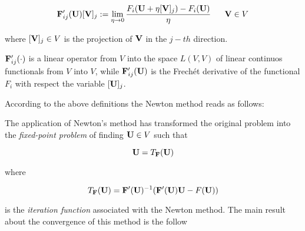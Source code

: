 \begin{equation}
\vect{F}'_{ij}(\vect{U})[\vect{V}]_j := \lim_{\eta \to 0}\dfrac{F_i(\vect{U}+\eta [\vect{V}]_j)-F_i(\vect{U})}{\eta}  \psp{10} \vect{V} \in V
\end{equation}

where $[\mathbf{V}]_j \in V$ is the projection  of  $\mathbf{V}$ in the $j-th$ direction. 

$\mathbf{F}'_{ij}(\cdot)$ is a linear operator from $V$ into the space $L(V,V)$ of linear continuos functionals from $V$ into $V$, while $\mathbf{F}'_{ij}(\mathbf{U})$ is the Frech\'et derivative of the functional $F_i$ with respect the variable $[\mathbf{U}]_j$.

According to the above definitions the Newton method reads as follows:


\vspace{0.3cm}
The application of Newton's method has transformed the original problem  into the \textit{fixed-point problem} of finding $\mathbf{U} \in V$ such that

\begin{equation}
\label{eq: fixed point U}
\mathbf{U} = T_{\mathbf{F}}(\mathbf{U})
\end{equation}

where 

\begin{equation}
\label{eq: iteration function}
T_{\mathbf{F}}(\mathbf{U}) = \mathbf{F}'(\mathbf{U})^{-1}(\mathbf{F}'(\mathbf{U})\mathbf{U}-F(\mathbf{U}))
\end{equation}

is the \textit{iteration function} associated with the Newton method.
The main result about the convergence of this method is the follow \cite{Ortega:IterNonlinearEq}

